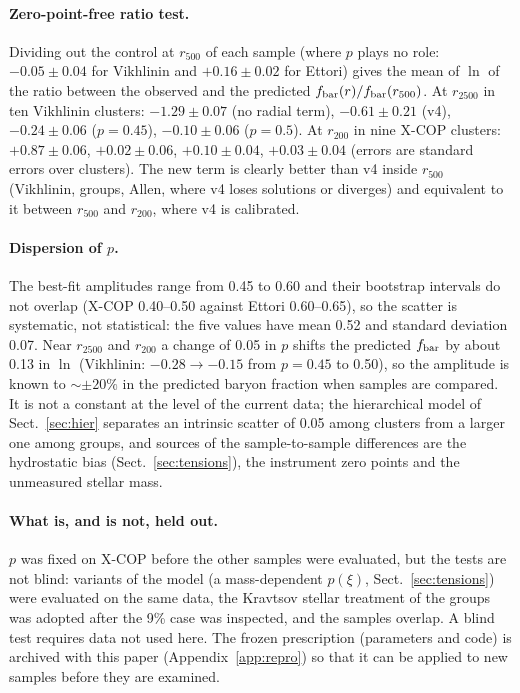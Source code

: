 \documentclass[11pt,a4paper]{article}
\newcommand{\fbar}{f_{\rm bar}}
\begin{document}
\paragraph{Zero-point-free ratio test.} Dividing out the control at $r_{500}$ of each sample (where $p$ plays no role: $-0.05\pm0.04$ for Vikhlinin and $+0.16\pm0.02$ for Ettori) gives the mean of $\ln$ of the ratio between the observed and the predicted $\fbar(r)/\fbar(r_{500})$. At $r_{2500}$ in ten Vikhlinin clusters: $-1.29\pm0.07$ (no radial term), $-0.61\pm0.21$ (v4), $-0.24\pm0.06$ ($p=0.45$), $-0.10\pm0.06$ ($p=0.5$). At $r_{200}$ in nine X-COP clusters: $+0.87\pm0.06$, $+0.02\pm0.06$, $+0.10\pm0.04$, $+0.03\pm0.04$ (errors are standard errors over clusters). The new term is clearly better than v4 inside $r_{500}$ (Vikhlinin, groups, Allen, where v4 loses solutions or diverges) and equivalent to it between $r_{500}$ and $r_{200}$, where v4 is calibrated.

\paragraph{Dispersion of $p$.} The best-fit amplitudes range from 0.45 to 0.60 and their bootstrap intervals do not overlap (X-COP 0.40--0.50 against Ettori 0.60--0.65), so the scatter is systematic, not statistical: the five values have mean 0.52 and standard deviation 0.07. Near $r_{2500}$ and $r_{200}$ a change of 0.05 in $p$ shifts the predicted $\fbar$ by about 0.13 in $\ln$ (Vikhlinin: $-0.28\to-0.15$ from $p=0.45$ to 0.50), so the amplitude is known to $\sim\pm20\%$ in the predicted baryon fraction when samples are compared. It is not a constant at the level of the current data; the hierarchical model of Sect.~\ref{sec:hier} separates an intrinsic scatter of 0.05 among clusters from a larger one among groups, and sources of the sample-to-sample differences are the hydrostatic bias (Sect.~\ref{sec:tensions}), the instrument zero points and the unmeasured stellar mass.

\paragraph{What is, and is not, held out.} $p$ was fixed on X-COP before the other samples were evaluated, but the tests are not blind: variants of the model (a mass-dependent $p(\xi)$, Sect.~\ref{sec:tensions}) were evaluated on the same data, the Kravtsov stellar treatment of the groups was adopted after the 9\% case was inspected, and the samples overlap. A blind test requires data not used here. The frozen prescription (parameters and code) is archived with this paper (Appendix~\ref{app:repro}) so that it can be applied to new samples before they are examined.
\end{document}
